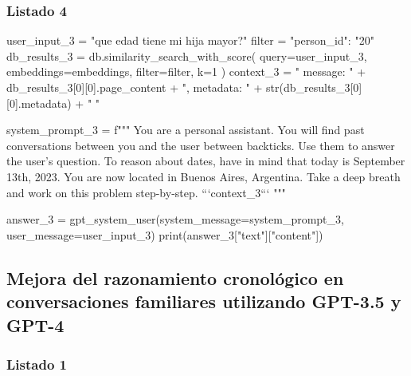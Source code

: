 \subsubsection{Listado 4}
\label{anexo:code-4-1-11-4}

\begin{APACode}
user_input_3 = "que edad tiene mi hija mayor?"
filter = {"person_id": "20"}
db_results_3 = db.similarity_search_with_score(
    query=user_input_3, embeddings=embeddings, filter=filter, k=1
)
context_3 = "{ message: " + db_results_3[0][0].page_content + ", metadata: " + str(db_results_3[0][0].metadata) + " }"

system_prompt_3 = f"""
You are a personal assistant. You will find past conversations between you and the user between backticks.
Use them to answer the user's question.
To reason about dates, have in mind that today is September 13th, 2023.
You are now located in Buenos Aires, Argentina.
Take a deep breath and work on this problem step-by-step.
```{context_3}```
"""

answer_3 = gpt_system_user(system_message=system_prompt_3, user_message=user_input_3)
print(answer_3["text"]["content"])
\end{APACode}

\subsection{Mejora del razonamiento cronológico en conversaciones familiares utilizando GPT-3.5 y GPT-4}

\subsubsection{Listado 1}
\label{anexo:code-4-1-12-1}

